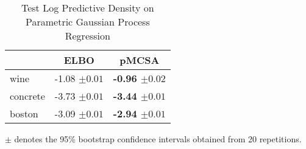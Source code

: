 
\begin{wraptable}{r}{0.4\textwidth}
  \centering
  \caption{Test Log Predictive Density on Parametric Gaussian Process Regression}\label{table:gp}
  \setlength{\tabcolsep}{4pt}
  \begin{threeparttable}
  \begin{tabular}{lrr}
    \toprule
    & \multicolumn{1}{c}{ELBO} & \multicolumn{1}{c}{\multirow{1}{*}{\textbf{pMCSA}}} \\
    \midrule
    wine & {-1.08 {\scriptsize{\(\pm 0.01\)}}} & {\bf-0.96 {\scriptsize{\(\pm 0.02\)}}} \\
    concrete & {-3.73 {\scriptsize{\(\pm 0.01\)}}} & {\bf-3.44 {\scriptsize{\(\pm 0.01\)}}} \\
    boston & {-3.09 {\scriptsize{\(\pm 0.01\)}}} & {\bf-2.94 {\scriptsize{\(\pm 0.01\)}}} \\
    \bottomrule
  \end{tabular}
  \begin{tablenotes}
    \item[]{\footnotesize \(\pm\) denotes the 95\% bootstrap confidence intervals obtained from 20 repetitions.}
  \end{tablenotes}
  \end{threeparttable}
  \vspace{-0.15in}
\end{wraptable}

